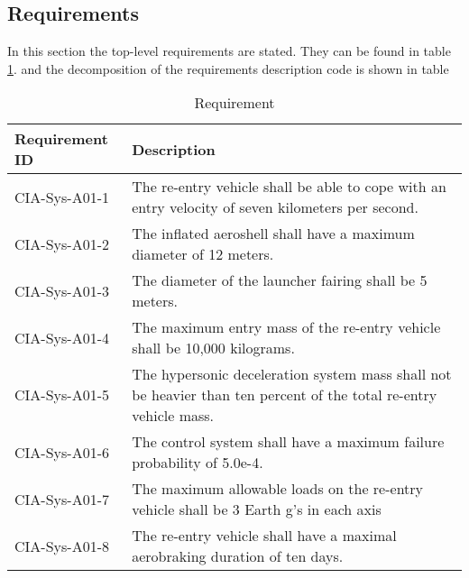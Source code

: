\subsection{Requirements} \label{subsec:systemrequirements}
In this section the top-level requirements are stated. They can be found in table \ref{tab:requirements}. and the decomposition of the requirements description code is shown in table

\begin{table}[H]
	\caption{Requirement}
	\begin{tabular}{|p{}|p{}|}
    \hline
    Requirement ID          & Description                                                                                                      \\ \hline \hline
    CIA-Sys-A01-1 & The re-entry vehicle shall be able to cope with an entry velocity of seven kilometers per second.                \\ \hline
    CIA-Sys-A01-2 & The inflated aeroshell shall have a maximum diameter of 12 meters.                                               \\ \hline
    CIA-Sys-A01-3 & The diameter of the launcher fairing shall be 5 meters.                                                          \\ \hline
    CIA-Sys-A01-4 & The maximum entry mass of the re-entry vehicle shall be 10,000 kilograms.                                         \\ \hline
    CIA-Sys-A01-5 & The hypersonic deceleration system mass shall not be heavier than ten percent of the total re-entry vehicle mass. \\ \hline
    CIA-Sys-A01-6 & The control system shall have a maximum failure probability of 5.0e-4.                                           \\ \hline
    CIA-Sys-A01-7 & The maximum allowable loads on the re-entry vehicle shall be 3 Earth g's in each axis                            \\ \hline
    CIA-Sys-A01-8 & The re-entry vehicle shall have a maximal aerobraking duration of ten days.                                      \\ \hline
    \end{tabular}
    \label{tab:requirements}
\end{table}

